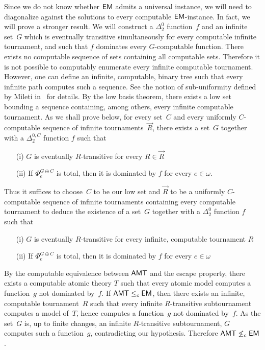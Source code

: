 Since we do not know whether $\operatorname{\sf{EM}}$ admits a universal instance, we will need to diagonalize against
the solutions to every computable $\operatorname{\sf{EM}}$-instance. In fact, we will prove a stronger result. We will construct
a $\Delta^0_2$ function~$f$ and an infinite set~$G$ which is eventually transitive simultaneously for every computable infinite tournament,
and such that $f$ dominates every $G$-computable function. There exists no computable sequence of sets
containing all computable sets. Therefore it is not possible to computably enumerate every infinite computable tournament.
However, one can define an infinite, computable, binary tree such that every infinite path
computes such a sequence. 
See the notion of sub-uniformity defined by Mileti in~\cite{Mileti2004Partition} for details.
By the low basis theorem, there exists a low set bounding a sequence containing, 
among others, every infinite computable tournament.
As we shall prove below,  for every set~$C$ and every uniformly $C$-computable sequence of infinite tournaments~$\vec{R}$,
there exists a set~$G$ together with a $\Delta^{0, C}_2$ function $f$ such that
\begin{itemize}
	\item[(i)] $G$ is eventually $R$-transitive for every $R \in \vec{R}$
	\item[(ii)] If $\Phi^{G \oplus C}_e$ is total, then it is dominated by $f$ for every $e \in \omega$.
\end{itemize}
Thus it suffices to choose~$C$ to be our low set and $\vec{R}$ to be a uniformly $C$-computable sequence
of infinite tournaments containing every computable tournament to deduce the existence of a set~$G$ together
with a $\Delta^0_2$ function $f$ such that 
\begin{itemize}
	\item[(i)] $G$ is eventually $R$-transitive for every infinite, computable tournament $R$
	\item[(ii)] If $\Phi^{G \oplus C}_e$ is total, then it is dominated by $f$ for every $e \in \omega$
\end{itemize}

By the computable equivalence between $\operatorname{\sf{AMT}}$ and the escape property,
there exists a computable atomic theory $T$ such that every atomic model computes
a function~$g$ not dominated by~$f$. If $\operatorname{\sf{AMT}} \leq_c \operatorname{\sf{EM}}$, then there exists
an infinite, computable tournament~$R$ such that every infinite $R$-transitive subtournament 
computes a model of~$T$, hence computes a function~$g$ not dominated by~$f$.
As the set~$G$ is, up to finite changes, an infinite $R$-transitive subtournament,
$G$ computes such a function~$g$, contradicting our hypothesis. Therefore $\operatorname{\sf{AMT}} \not \leq_c \operatorname{\sf{EM}}$.


